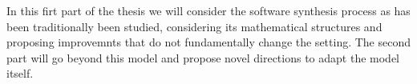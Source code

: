In this firt part of the thesis we will consider the software synthesis process as has been traditionally been studied, considering its mathematical structures and proposing improvemnts that do not fundamentally change the setting. The second part will go beyond this model and propose novel directions to adapt the model itself.
